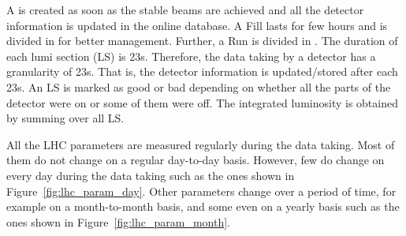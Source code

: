 A  is created as soon as the stable beams are achieved and all the detector information
is updated in the online database. A Fill lasts for few hours and is divided in 
 for better management. Further, a Run is divided in . The duration
of each lumi section (LS) is 23\unit{s}. Therefore, the data taking by a detector has a granularity
of 23\unit{s}. That is, the detector information is updated/stored after each 23\unit{s}. An LS 
is marked as good or bad depending on whether all the parts of the detector were
on or some of them were off. The integrated luminosity is obtained by summing over all LS.

All the LHC parameters are measured regularly during the data taking. Most of them
do not change on a regular day-to-day basis. However, few do change on every day during the data
taking such as the ones shown in Figure~\ref{fig:lhc_param_day}. Other parameters change over
a period of time, for example on a month-to-month basis, and some even on a yearly basis
such as the ones shown in Figure~\ref{fig:lhc_param_month}.

